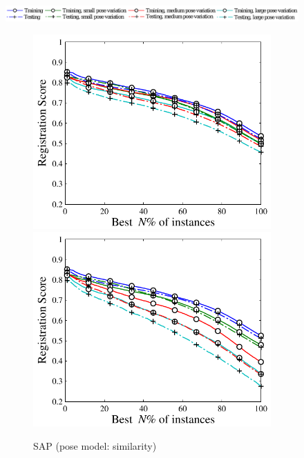 \begin{figure}[ht]
\centering 
\includegraphics[width=0.80\linewidth]{fig/3dreg/reg2d_legend.pdf}
\begin{subfigure}[b]{0.23\linewidth}
	\includegraphics[width=\linewidth]{fig/3dreg/reg2d_simsim.pdf}
	\includegraphics[width=\linewidth]{fig/3dreg/reg2d_simaff.pdf}
	\caption{SAP (pose model: similarity)}
\end{subfigure}
\begin{subfigure}[b]{0.23\linewidth}

\end{subfigure}
\end{figure}
